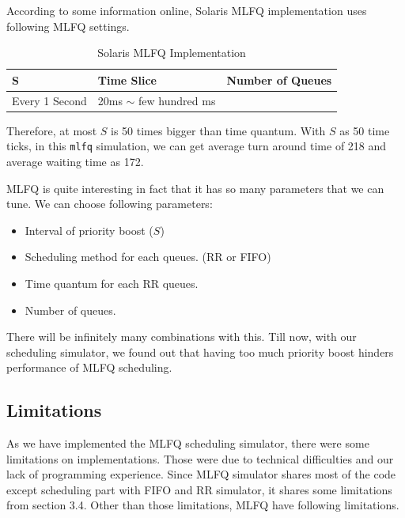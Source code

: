 \documentclass{homework}
\begin{document}
According to some information online, Solaris MLFQ implementation uses following MLFQ settings.
\begin{center}
\begin{table}[h]
\begin{tabularx}{1.0\textwidth} { 
  | >{\centering\arraybackslash}X 
  | >{\centering\arraybackslash}X 
  | >{\centering\arraybackslash}X | }
 \hline
 S & Time Slice & Number of Queues\\
 \hline
 Every 1 Second & 20ms $\sim$ few hundred ms & 60\\
\hline
\end{tabularx}
\caption{Solaris MLFQ Implementation}
\end{table}
\end{center}
\pagebreak
Therefore, at most $S$ is 50 times bigger than time quantum. With $S$ as 50 time ticks, in this \texttt{mlfq} simulation, we can get average turn around time of 218 and average waiting time as 172.

MLFQ is quite interesting in fact that it has so many parameters that we can tune. We can choose following parameters:
\begin{itemize}
    \item Interval of priority boost ($S$)
    \item Scheduling method for each queues. (RR or FIFO)
    \item Time quantum for each RR queues.
    \item Number of queues.
\end{itemize}
There will be infinitely many combinations with this. Till now, with our scheduling simulator, we found out that having too much priority boost hinders performance of MLFQ scheduling.
\subsection{Limitations}
As we have implemented the MLFQ scheduling simulator, there were some limitations on implementations. Those were due to technical difficulties and our lack of programming experience. Since MLFQ simulator shares most of the code except scheduling part with FIFO and RR simulator, it shares some limitations from section 3.4. Other than those limitations, MLFQ have following limitations.
\end{document}
